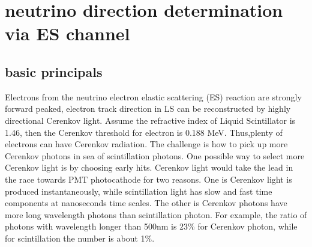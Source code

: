 \documentclass[a4paper,10pt]{cpc-hepnp}
\begin{document}
\section{neutrino direction determination via ES channel}
\subsection{basic principals}
Electrons from the neutrino electron elastic scattering (ES) reaction are
strongly forward peaked, electron track direction in LS can be reconstructed
by highly directional Cerenkov light. Assume the refractive index of Liquid Scintillator is 1.46, then the Cerenkov threshold for electron is 0.188 MeV. Thus,plenty of electrons
can have Cerenkov radiation. The challenge is how to pick up more Cerenkov
photons in sea of scintillation photons. One possible way to select more
Cerenkov light is by choosing early hits. Cerenkov light would take the lead in
the race towards PMT photocathode for two reasons. One is Cerenkov light is
produced instantaneously, while scintillation light has slow and fast time
components at nanoseconds time scales. The other is Cerenkov photons have more
long wavelength photons than scintillation photon. For example, the ratio of
photons with wavelength longer than 500nm is 23\% for Cerenkov photon, while
for scintillation the number is about 1\%.
\end{document}
